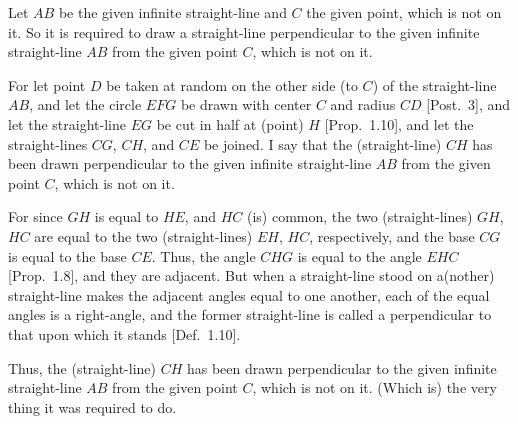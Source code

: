 \begin{Parallel}{}{}
{\epsfysize=2.2in
\centerline{}

Let $AB$ be the given infinite straight-line  and $C$ the given point, which is not
on it. So it is required to draw a  straight-line  perpendicular to the
given infinite straight-line $AB$ from the given point $C$, which is not on
it.

For let point $D$ be taken at random on the other side (to $C$) of 
the straight-line $AB$, and let the circle $EFG$ be drawn
with center $C$ and radius $CD$ [Post.~3], and let the straight-line $EG$ be cut
in half at (point) $H$ [Prop.~1.10], and let the straight-lines $CG$, $CH$,
and $CE$ be joined. I say that the  (straight-line) $CH$ has
been drawn  perpendicular to the given infinite straight-line
$AB$ from the given point $C$, which is not on it.

For since $GH$ is equal to $HE$, and $HC$ (is) common, the two (straight-lines) $GH$, 
$HC$
are equal to the two (straight-lines) $EH$, $HC$, respectively, and the base $CG$ is
equal to the base $CE$. Thus, the angle $CHG$ is equal to the
angle $EHC$ [Prop.~1.8], and they are adjacent. But when a straight-line
stood on a(nother) straight-line makes the adjacent angles equal to one another, each of the equal angles is a right-angle, and the former straight-line is called a perpendicular to that upon which it stands [Def.~1.10].

Thus, the (straight-line) $CH$ has been drawn perpendicular to the given infinite straight-line $AB$ from the given point $C$, which is not
on  it. (Which is) the very thing it was required to do.}
\end{Parallel}

